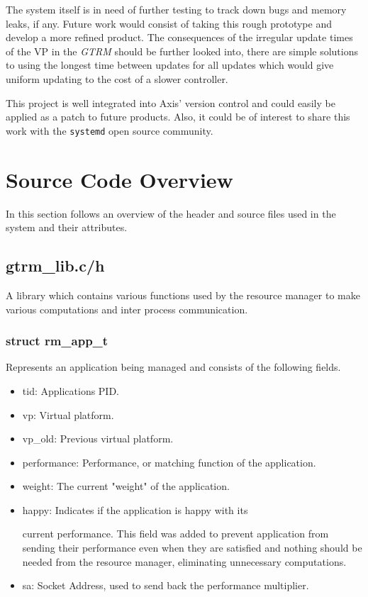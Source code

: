 \documentclass[nobiblatex]{LTHthesis}
\begin{document}
The system itself is in need of further testing to track down bugs and
memory leaks, if any. Future work would consist of taking this rough
prototype and develop a more refined product. The consequences of the irregular update times of the VP
in the \emph{GTRM} should be further looked into, there are simple solutions to using the longest time 
between updates for all updates which would give uniform updating to the cost of a slower controller.


This project is well 
integrated into Axis' version control and could easily be applied as a 
patch to future products. Also, it could be of interest to share this 
work with the \texttt{systemd} open source community.





\appendix

\chapter{Source Code Overview}

In this section follows an overview of the header and source files used in the system and their attributes.

\section{gtrm\_lib.c/h}
A library which contains various functions used by the resource manager to make various computations and inter process communication.

\subsection{struct rm\_app\_t}
Represents an application being managed and consists of the following fields.
\begin{itemize}
\item tid: Applications PID.
\item vp: Virtual platform.
\item vp\_old: Previous virtual platform.
\item performance: Performance, or matching function of the application.
\item weight: The current "weight" of the application.
\item happy: Indicates if the application is happy with its 

	  current performance. This field was added to prevent application from sending their performance even when they are satisfied and nothing should be needed from the resource manager, eliminating unnecessary computations.
\item sa: Socket Address, used to send back the performance multiplier.
\end{itemize}
\end{document}

